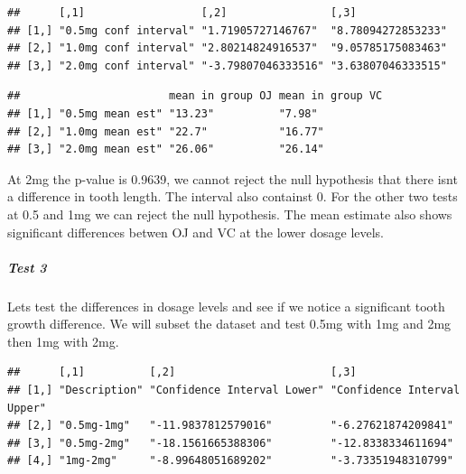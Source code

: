 \documentclass[]{article}
\newenvironment{Shaded}{\begin{snugshade}}{\end{snugshade}}
\newcommand{\KeywordTok}[1]{\textcolor[rgb]{0.13,0.29,0.53}{\textbf{{#1}}}}
\newcommand{\FloatTok}[1]{\textcolor[rgb]{0.00,0.00,0.81}{{#1}}}
\newcommand{\StringTok}[1]{\textcolor[rgb]{0.31,0.60,0.02}{{#1}}}
\newcommand{\NormalTok}[1]{{#1}}
\begin{document}
\begin{verbatim}
##      [,1]                  [,2]                [,3]              
## [1,] "0.5mg conf interval" "1.71905727146767"  "8.78094272853233"
## [2,] "1.0mg conf interval" "2.80214824916537"  "9.05785175083463"
## [3,] "2.0mg conf interval" "-3.79807046333516" "3.63807046333515"
\end{verbatim}

\begin{verbatim}
##                       mean in group OJ mean in group VC
## [1,] "0.5mg mean est" "13.23"          "7.98"          
## [2,] "1.0mg mean est" "22.7"           "16.77"         
## [3,] "2.0mg mean est" "26.06"          "26.14"
\end{verbatim}

At 2mg the p-value is 0.9639, we cannot reject the null hypothesis that
there isnt a difference in tooth length. The interval also containst 0.
For the other two tests at 0.5 and 1mg we can reject the null
hypothesis. The mean estimate also shows significant differences betwen
OJ and VC at the lower dosage levels.

\subparagraph{Test 3}\label{test-3}

Lets test the differences in dosage levels and see if we notice a
significant tooth growth difference. We will subset the dataset and test
0.5mg with 1mg and 2mg then 1mg with 2mg.

\begin{Shaded}
\end{Shaded}

\begin{verbatim}
##      [,1]          [,2]                        [,3]                       
## [1,] "Description" "Confidence Interval Lower" "Confidence Interval Upper"
## [2,] "0.5mg-1mg"   "-11.9837812579016"         "-6.27621874209841"        
## [3,] "0.5mg-2mg"   "-18.1561665388306"         "-12.8338334611694"        
## [4,] "1mg-2mg"     "-8.99648051689202"         "-3.73351948310799"
\end{verbatim}
\end{document}
